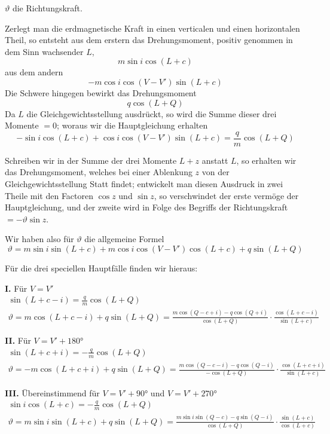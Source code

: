 \documentclass[12pt,a4paper]{article}
\begin{document}
$\vartheta$ die Richtungskraft.

Zerlegt man die erdmagnetische Kraft in einen verticalen und einen horizontalen Theil, so entsteht aus dem erstern das Drehungsmoment, positiv genommen in dem Sinn wachsender $L$,
\[ m \sin i \cos(L + c) \]
aus dem andern
\[ -m \cos i \cos(V - V') \sin(L + c) \]
Die Schwere hingegen bewirkt das Drehungsmoment
\[ q \cos(L + Q) \]
Da $L$ die Gleichgewichtsstellung ausdrückt, so wird die Summe dieser drei Momente $= 0$; woraus wir die Hauptgleichung erhalten
\[ -\sin i \cos(L + c) + \cos i \cos(V - V') \sin(L + c) = \frac{q}{m} \cos(L + Q) \]

Schreiben wir in der Summe der drei Momente $L + z$ anstatt $L$, so erhalten wir das Drehungsmoment, welches bei einer Ablenkung $z$ von der Gleichgewichtsstellung Statt findet; entwickelt man diesen Ausdruck in zwei Theile mit den Factoren $\cos z$ und $\sin z$, so verschwindet der erste vermöge der Hauptgleichung, und der zweite wird in Folge des Begriffs der Richtungskraft $= -\vartheta \sin z$.

Wir haben also für $\vartheta$ die allgemeine Formel
\[ \vartheta = m \sin i \sin(L + c) + m \cos i \cos(V - V') \cos(L + c) + q \sin(L + Q) \]

Für die drei speciellen Hauptfälle finden wir hieraus:

\textbf{I.} Für $V = V'$
\begin{gather*}
\sin(L + c - i) = \frac{q}{m} \cos(L + Q) \\
\vartheta = m \cos(L + c - i) + q \sin(L + Q) = \frac{m \cos(Q - c + i) - q \cos(Q + i)}{\cos(L + Q)} \cdot \frac{\cos(L + c - i)}{\sin(L + c)}
\end{gather*}

\textbf{II.} Für $V = V' + 180°$
\begin{gather*}
\sin(L + c + i) = -\frac{q}{m} \cos(L + Q) \\
\vartheta = -m \cos(L + c + i) + q \sin(L + Q) = \frac{m \cos(Q - c - i) - q \cos(Q - i)}{-\cos(L + Q)} \cdot \frac{\cos(L + c + i)}{\sin(L + c)}
\end{gather*}

\textbf{III.} Übereinstimmend für $V = V' + 90°$ und $V = V' + 270°$
\begin{gather*}
\sin i \cos(L + c) = -\frac{q}{m} \cos(L + Q) \\
\vartheta = m \sin i \sin(L + c) + q \sin(L + Q) = \frac{m \sin i \sin(Q - c) - q \sin(Q - i)}{\cos(L + Q)} \cdot \frac{\sin(L + c)}{\cos(L + c)}
\end{gather*}
\end{document}
